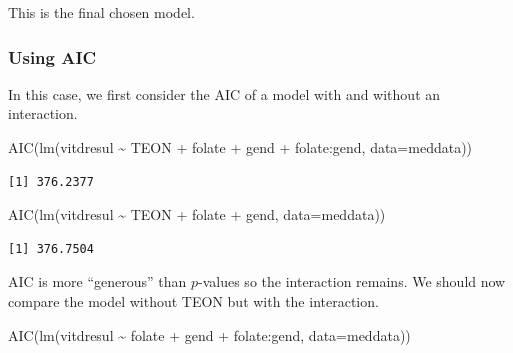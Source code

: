 \documentclass[
  oneside]{krantz}
\newenvironment{Shaded}{\begin{snugshade}}{\end{snugshade}}
\newcommand{\AttributeTok}[1]{\textcolor[rgb]{0.77,0.63,0.00}{#1}}
\newcommand{\FunctionTok}[1]{\textcolor[rgb]{0.00,0.00,0.00}{#1}}
\newcommand{\NormalTok}[1]{#1}
\newcommand{\SpecialCharTok}[1]{\textcolor[rgb]{0.00,0.00,0.00}{#1}}
\begin{document}
This is the final chosen model.

\hypertarget{using-aic-1}{%
\subsubsection{Using AIC}\label{using-aic-1}}

In this case, we first consider the AIC of a model with and without an interaction.

\begin{Shaded}
\begin{Highlighting}[]
\FunctionTok{AIC}\NormalTok{(}\FunctionTok{lm}\NormalTok{(vitdresul }\SpecialCharTok{\textasciitilde{}}\NormalTok{ TEON }\SpecialCharTok{+}\NormalTok{ folate }\SpecialCharTok{+}\NormalTok{ gend }\SpecialCharTok{+}\NormalTok{ folate}\SpecialCharTok{:}\NormalTok{gend, }\AttributeTok{data=}\NormalTok{meddata))}
\end{Highlighting}
\end{Shaded}

\begin{verbatim}
[1] 376.2377
\end{verbatim}

\begin{Shaded}
\begin{Highlighting}[]
\FunctionTok{AIC}\NormalTok{(}\FunctionTok{lm}\NormalTok{(vitdresul }\SpecialCharTok{\textasciitilde{}}\NormalTok{ TEON }\SpecialCharTok{+}\NormalTok{ folate }\SpecialCharTok{+}\NormalTok{ gend, }\AttributeTok{data=}\NormalTok{meddata))}
\end{Highlighting}
\end{Shaded}

\begin{verbatim}
[1] 376.7504
\end{verbatim}

AIC is more ``generous'' than \(p\)-values so the interaction remains. We should now compare the model without TEON but with the interaction.

\begin{Shaded}
\begin{Highlighting}[]
\FunctionTok{AIC}\NormalTok{(}\FunctionTok{lm}\NormalTok{(vitdresul }\SpecialCharTok{\textasciitilde{}}\NormalTok{ folate }\SpecialCharTok{+}\NormalTok{ gend }\SpecialCharTok{+}\NormalTok{ folate}\SpecialCharTok{:}\NormalTok{gend, }\AttributeTok{data=}\NormalTok{meddata))}
\end{Highlighting}
\end{Shaded}
\end{document}
